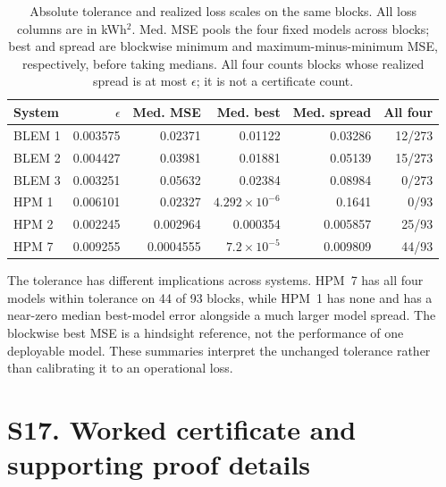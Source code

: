 \begin{table}[htbp]\centering\small
\caption{Absolute tolerance and realized loss scales on the same blocks. All loss columns are in kWh$^2$. Med. MSE pools the four fixed models across blocks; best and spread are blockwise minimum and maximum-minus-minimum MSE, respectively, before taking medians. All four counts blocks whose realized spread is at most $\epsilon$; it is not a certificate count.}
\label{tab:retrieval-tolerance-scale}
\begin{tabular}{lrrrrr}\toprule
System & $\epsilon$ & Med. MSE & Med. best & Med. spread & All four\\\midrule
BLEM 1 & 0.003575 & 0.02371 & 0.01122 & 0.03286 & 12/273\\
BLEM 2 & 0.004427 & 0.03981 & 0.01881 & 0.05139 & 15/273\\
BLEM 3 & 0.003251 & 0.05632 & 0.02384 & 0.08984 & 0/273\\
HPM 1 & 0.006101 & 0.02327 & $4.292\times10^{-6}$ & 0.1641 & 0/93\\
HPM 2 & 0.002245 & 0.002964 & 0.000354 & 0.005857 & 25/93\\
HPM 7 & 0.009255 & 0.0004555 & $7.2\times10^{-5}$ & 0.009809 & 44/93\\
\bottomrule\end{tabular}\end{table}
The tolerance has different implications across systems. HPM~7 has all four models within tolerance on 44 of 93 blocks, while HPM~1 has none and has a near-zero median best-model error alongside a much larger model spread. The blockwise best MSE is a hindsight reference, not the performance of one deployable model. These summaries interpret the unchanged tolerance rather than calibrating it to an operational loss.
\section{S17. Worked certificate and supporting proof details}
